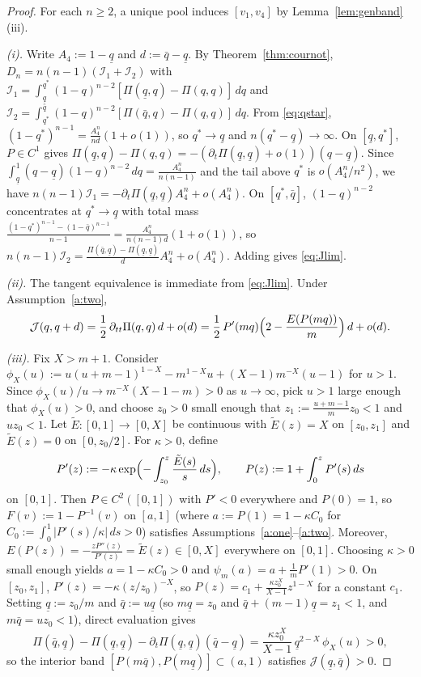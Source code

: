 \documentclass[12pt]{article}
\theoremstyle{mystyle}
\theoremstyle{mystyle2}
\newcommand{\1}{\mathbf{1}}
\begin{document}
\begin{proof}
For each $n\ge 2$, a unique pool induces $[v_1,v_4]$ by Lemma~\ref{lem:genband}(iii).

\emph{(i).} Write $A_4:=1-\underline q$ and $d:=\bar q-\underline q$. By Theorem~\ref{thm:cournot}, $D_n=n(n-1)(\mathcal I_1+\mathcal I_2)$ with $\mathcal I_1=\int_{\underline q}^{q^*}(1-q)^{n-2}[\Pi(\underline q,q)-\Pi(q,q)]\,dq$ and $\mathcal I_2=\int_{q^*}^{\bar q}(1-q)^{n-2}[\Pi(\bar q,q)-\Pi(q,q)]\,dq$. From \eqref{eq:qstar}, $(1-q^*)^{n-1}=\frac{A_4^n}{nd}(1+o(1))$, so $q^*\to\underline q$ and $n(q^*-\underline q)\to\infty$.
On $[\underline q,q^*]$, $P\in C^1$ gives $\Pi(\underline q,q)-\Pi(q,q)=-(\partial_t\Pi(\underline q,\underline q)+o(1))(q-\underline q)$. Since $\int_{\underline q}^1(q-\underline q)(1-q)^{n-2}\,dq=\frac{A_4^n}{n(n-1)}$ and the tail above $q^*$ is $o(A_4^n/n^2)$, we have $n(n-1)\mathcal I_1=-\partial_t\Pi(\underline q,\underline q)A_4^n+o(A_4^n)$.
On $[q^*,\bar q]$, $(1-q)^{n-2}$ concentrates at $q^*\to\underline q$ with total mass $\frac{(1-q^*)^{n-1}-(1-\bar q)^{n-1}}{n-1}=\frac{A_4^n}{n(n-1)d}(1+o(1))$, so $n(n-1)\mathcal I_2=\frac{\Pi(\bar q,\underline q)-\Pi(\underline q,\underline q)}{d}A_4^n+o(A_4^n)$. Adding gives \eqref{eq:Jlim}.

\emph{(ii).} The tangent equivalence is immediate from \eqref{eq:Jlim}. Under Assumption~\ref{a:two},
\[
\mathcal J(q,q+d) = \frac{1}{2}\,\partial_{tt}\Pi(q,q)\,d + o(d) = \frac{1}{2}\,P'(mq)\Bigl(2-\frac{E(P(mq))}{m}\Bigr)\,d + o(d).
\]

\emph{(iii).} Fix $X>m+1$. Consider $\phi_X(u):=u(u+m-1)^{1-X}-m^{1-X}u+(X-1)m^{-X}(u-1)$ for $u>1$. Since $\phi_X(u)/u\to m^{-X}(X-1-m)>0$ as $u\to\infty$, pick $u>1$ large enough that $\phi_X(u)>0$, and choose $z_0>0$ small enough that $z_1:=\frac{u+m-1}{m}z_0<1$ and $u z_0<1$. Let $\tilde E:[0,1]\to[0,X]$ be continuous with $\tilde E(z)=X$ on $[z_0,z_1]$ and $\tilde E(z)=0$ on $[0,z_0/2]$. For $\kappa>0$, define
\[
P'(z) := -\kappa\exp\Bigl(-\int_{z_0}^z \frac{\tilde E(s)}{s}\,ds\Bigr), \qquad P(z) := 1 + \int_0^z P'(s)\,ds
\]
on $[0,1]$. Then $P\in C^2([0,1])$ with $P'<0$ everywhere and $P(0)=1$, so $F(v):=1-P^{-1}(v)$ on $[a,1]$ (where $a:=P(1)=1-\kappa C_0$ for $C_0:=\int_0^1 |P'(s)/\kappa|\,ds>0$) satisfies Assumptions~\ref{a:one}--\ref{a:two}. Moreover, $E(P(z))=-\frac{zP''(z)}{P'(z)}=\tilde E(z)\in[0,X]$ everywhere on $[0,1]$. Choosing $\kappa>0$ small enough yields $a=1-\kappa C_0>0$ and $\psi_m(a)=a+\frac{1}{m}P'(1)>0$. On $[z_0,z_1]$, $P'(z)=-\kappa(z/z_0)^{-X}$, so $P(z)=c_1+\frac{\kappa z_0^X}{X-1}z^{1-X}$ for a constant $c_1$. Setting $\underline q:=z_0/m$ and $\bar q:=u\underline q$ (so $m\underline q=z_0$ and $\bar q+(m-1)\underline q=z_1<1$, and $m\bar q=uz_0<1$), direct evaluation gives
\[
\Pi(\bar q,\underline q)-\Pi(\underline q,\underline q)-\partial_t\Pi(\underline q,\underline q)(\bar q-\underline q) = \frac{\kappa z_0^X}{X-1}\,\underline q^{2-X}\,\phi_X(u) > 0,
\]
so the interior band $[P(m\bar q),P(m\underline q)]\subset(a,1)$ satisfies $\mathcal J(\underline q,\bar q)>0$.
\end{proof}
\end{document}
